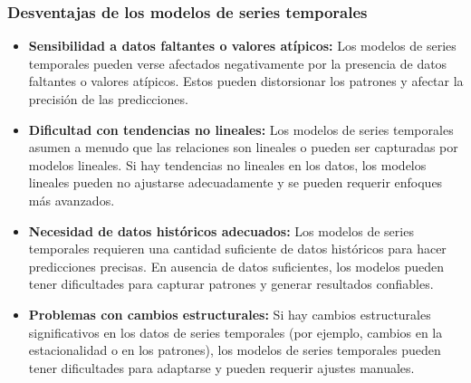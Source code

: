 \subsubsection{Desventajas de los modelos de series temporales}
\begin{itemize}
        \item \textbf{Sensibilidad a datos faltantes o valores atípicos:} Los modelos de series temporales pueden verse afectados negativamente por la presencia de datos faltantes o valores atípicos. Estos pueden distorsionar los patrones y afectar la precisión de las predicciones.
        \item \textbf{Dificultad con tendencias no lineales:} Los modelos de series temporales asumen a menudo que las relaciones son lineales o pueden ser capturadas por modelos lineales. Si hay tendencias no lineales en los datos, los modelos lineales pueden no ajustarse adecuadamente y se pueden requerir enfoques más avanzados.
        \item \textbf{Necesidad de datos históricos adecuados:} Los modelos de series temporales requieren una cantidad suficiente de datos históricos para hacer predicciones precisas. En ausencia de datos suficientes, los modelos pueden tener dificultades para capturar patrones y generar resultados confiables.
        \item \textbf{Problemas con cambios estructurales:} Si hay cambios estructurales significativos en los datos de series temporales (por ejemplo, cambios en la estacionalidad o en los patrones), los modelos de series temporales pueden tener dificultades para adaptarse y pueden requerir ajustes manuales.

\end{itemize}